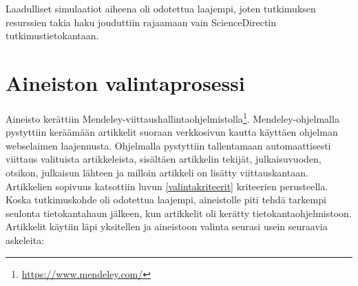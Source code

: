 \documentclass[utf8]{gradu3}
\begin{document}
\begin{table}[h]
\centering
{}
\caption{Hakutulosten määrä hakukohteista}
\label{table: hakutulokset}
\end{table}

Laadulliset simulaatiot aiheena oli odotettua laajempi, 
joten tutkimuksen resurssien takia haku jouduttiin rajaamaan 
vain ScienceDirectin tutkimustietokantaan.

\section{Aineiston valintaprosessi} \label{valintaprosessi}
Aineisto kerättiin Mendeley-viittaushallintaohjelmistolla\footnote{\url{https://www.mendeley.com/}}. Mendeley-ohjelmalla pystyttiin keräämään artikkelit suoraan verkkosivun kautta käyttäen ohjelman webselaimen laajennusta. Ohjelmalla pystyttiin tallentamaan automaattisesti viittaus valituista artikkeleista, sisältäen artikkelin tekijät, julkaisuvuoden, otsikon, julkaisun lähteen ja milloin artikkeli on lisätty viittauskantaan. Artikkelien sopivuus katsottiin luvun \ref{valintakriteerit} kriteerien perusteella. 
Koska tutkimuskohde oli odotettua laajempi, 
aineistolle piti tehdä tarkempi seulonta tietokantahaun jälkeen, 
kun artikkelit oli kerätty tietokantaohjelmistoon. 
Artikkelit käytiin läpi yksitellen ja aineistoon valinta seurasi usein seuraavia askeleita:
\end{document}
